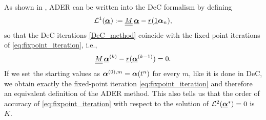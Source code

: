 \begin{remark}\label{rmk:ADERasDeC}
	As shown in \cite{Han_Veiga_2021,veiga2023improving}, 
	ADER can be written into the DeC formalism by defining
	\begin{equation}\label{eq:L1ADER}
	\mathcal{L}^1(\vec{\bc}):=\mat{M}\vec{\bc}-\vec{r}(\vec{1} \bc_n ),
	\end{equation}
	so that the DeC iterations \eqref{DeC_method} coincide with the fixed point iterations of \eqref{eq:fixpoint_iteration}, i.e.,
	 \begin{equation}
	 \mat{M}\vec{\bc}^{(k)}-\vec{r}(\vec{\bc}^{(k-1)})=0.
	 \end{equation}
	 If we set the starting values as $\boldsymbol{\alpha}^{(0),m}=\boldsymbol{\alpha}(t^n)$ for every $m$, like it is done in DeC, we obtain exactly the fixed-point iteration \eqref{eq:fixpoint_iteration} and therefore an equivalent definition of the ADER method.
	  This also tells us that the order of accuracy of \eqref{eq:fixpoint_iteration} with respect to the solution of $\mathcal L^2(\underline{\boldsymbol{\alpha}}^*)=0$ is $K$.
\end{remark}


